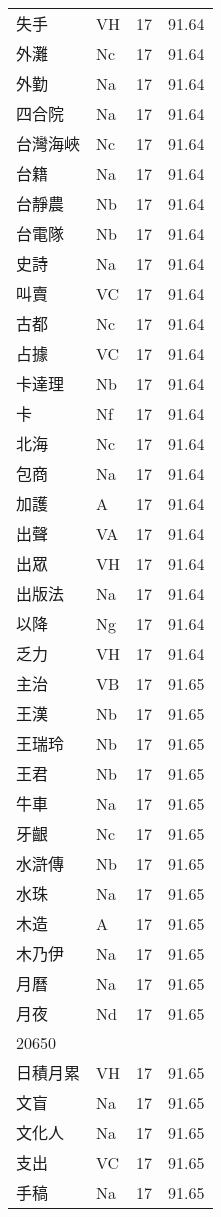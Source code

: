\documentclass[twocolumn]{book}
\begin{document}
\begin{supertabular}{llrr}
失手 & VH & 17 &  91.64\\
外灘 & Nc & 17 &  91.64\\
外勤 & Na & 17 &  91.64\\
四合院 & Na & 17 &  91.64\\
台灣海峽 & Nc & 17 &  91.64\\
台籍 & Na & 17 &  91.64\\
台靜農 & Nb & 17 &  91.64\\
台電隊 & Nb & 17 &  91.64\\
史詩 & Na & 17 &  91.64\\
叫賣 & VC & 17 &  91.64\\
古都 & Nc & 17 &  91.64\\
占據 & VC & 17 &  91.64\\
卡達理 & Nb & 17 &  91.64\\
卡 & Nf & 17 &  91.64\\
北海 & Nc & 17 &  91.64\\
包商 & Na & 17 &  91.64\\
加護 & A & 17 &  91.64\\
出聲 & VA & 17 &  91.64\\
出眾 & VH & 17 &  91.64\\
出版法 & Na & 17 &  91.64\\
以降 & Ng & 17 &  91.64\\
乏力 & VH & 17 &  91.64\\
主治 & VB & 17 &  91.65\\
王漢 & Nb & 17 &  91.65\\
王瑞玲 & Nb & 17 &  91.65\\
王君 & Nb & 17 &  91.65\\
牛車 & Na & 17 &  91.65\\
牙齦 & Nc & 17 &  91.65\\
水滸傳 & Nb & 17 &  91.65\\
水珠 & Na & 17 &  91.65\\
木造 & A & 17 &  91.65\\
木乃伊 & Na & 17 &  91.65\\
月曆 & Na & 17 &  91.65\\
月夜 & Nd & 17 &  91.65\\
20650\\
日積月累 & VH & 17 &  91.65\\
文盲 & Na & 17 &  91.65\\
文化人 & Na & 17 &  91.65\\
支出 & VC & 17 &  91.65\\
手稿 & Na & 17 &  91.65\\

\end{supertabular}
\end{document}
